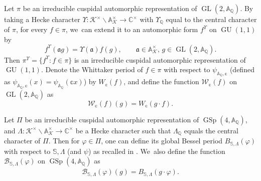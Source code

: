 \documentclass[10pt]{amsart}
\theoremstyle{plain}
\theoremstyle{remark}
\newcommand{\bA}{\mathbb{A}}
\newcommand{\bC}{\mathbb{C}}
\newcommand{\bQ}{\mathbb{Q}}
\newcommand{\bS}{\mathbb{S}}
\newcommand{\bbc}{\mathbb{c}}
\newcommand{\cB}{\mathcal{B}}
\newcommand{\cK}{\mathcal{K}}
\newcommand{\cW}{\mathcal{W}}
\newcommand{\fa}{\mathfrak{a}}
\DeclareMathOperator{\GL}{GL}
\DeclareMathOperator{\GSp}{GSp}
\DeclareMathOperator{\GU}{GU}
\let\mf f
\let\Bes\cB
\let\bes B
\let\Whi\cW
\let\whi W
\begin{document}
Let $\pi$ be an irreducible cuspidal automorphic representation of $\GL(2,\bA_\bQ)$. By taking a Hecke character $\Upsilon:\cK^\times\backslash\bA^\times_\cK\to\bC^\times$ with $\Upsilon_\bQ$ equal to the central character of $\pi$, for every $f\in\pi$, we~can extend it to an automorphic form $f^\Upsilon$ on $\GU(1,1)$ by
\begin{equation}\label{eq:extGL2}
\mf^\Upsilon(\fa g)=\Upsilon(\fa)f(g), \qquad\fa\in\bA^\times_\cK,\,g\in\GL(2,\bA_\bQ).
\end{equation}
Then $\pi^{\Upsilon}=\{f^\Upsilon:f\in\pi\}$ is an irreducible cuspidal automorphic representation of $\GU(1,1)$. Denote the Whittaker period of $f\in \pi$ with respect to $\psi_{\bA_\bQ,\bbc}$ (defined as $\psi_{\bA_\bQ,\bbc}(x)=\psi_{\bA_\bQ}(\bbc x)$) by $\whi_\bbc(f)$, and define the function $\Whi_\bbc(f)$ on $\GL(2,\bA_\bQ)$ as
\[
\Whi_\bbc(f)(g)=\whi_\bbc(g\cdot f).
\]

Let $\Pi$ be an irreducible cuspidal automorphic representation of $\GSp(4,\bA_\bQ)$, and $\Lambda:\cK^\times\backslash\bA^\times_\cK\to\bC^\times$ be a Hecke character such that $\Lambda_\bQ$ equals the central character of $\Pi$. Then for $\varphi\in \Pi$, one can define its global Bessel period $\bes_{\bS,\Lambda}(\varphi)$ with respect to $\bS,\Lambda$ (and $\psi$) as recalled in \cite[\S2.2.1]{pFL}. We~also define the function $\Bes_{\bS,\Lambda}(\varphi)$ on $\GSp(4,\bA_\bQ)$ as
\begin{align*}
\Bes_{\bS,\Lambda}(\varphi)(g)=\bes_{\bS,\Lambda}(g\cdot \varphi).
\end{align*}
\end{document}
